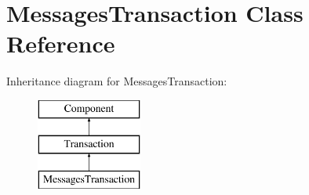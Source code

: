\hypertarget{classMessagesTransaction}{}\section{Messages\+Transaction Class Reference}
\label{classMessagesTransaction}
Inheritance diagram for Messages\+Transaction\+:\begin{figure}[H]
\begin{center}
\leavevmode
\includegraphics[height=3.000000cm]{classMessagesTransaction}
\end{center}
\end{figure}
